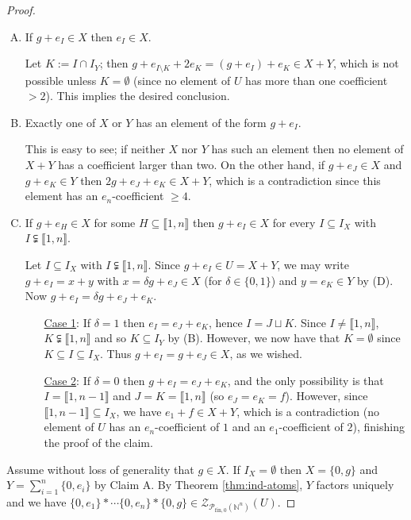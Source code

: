 \documentclass{report}
\newcommand{\NN}{\mathbb{N}}
\renewcommand{\P}{\mathcal{P}}
\newcommand{\Z}{\mathcal{Z}}
\newcommand{\llb}{\llbracket}
\newcommand{\rrb}{\rrbracket}
\newcommand{\fon}{{\textrm{fin}, 0}}
\renewcommand{\:}{\text{:}}
\theoremstyle{definition}
\begin{document}
\begin{proof}
\begin{enumerate}[(A)]
\item If $g + e_I\in X$ then $e_I\in X$. 

Let $K := I\cap I_Y$; then $g + e_{I\setminus K} + 2e_K = (g+e_I) + e_K \in X+Y$, which is not possible unless $K=\emptyset$ (since no element of $U$ has more than one coefficient $>2$).
This implies the desired conclusion.

\item Exactly one of $X$ or $Y$ has an element of the form $g + e_I$. 

This is easy to see; if neither $X$ nor $Y$ has such an element then no element of $X+Y$ has a coefficient larger than two.
On the other hand, if $g+e_J\in X$ and $g+e_K\in Y$ then $2g + e_J + e_K \in X+Y$, which is a contradiction since this element has an $e_n$-coefficient $\ge 4$.

\item If $g+ e_H\in X$ for some $H\subseteq \llb 1,n \rrb$ then $g + e_I \in X$ for every $I\subseteq I_X$ with $I\subsetneqq \llb 1,n\rrb$. 

Let $I \subseteq I_X$ with $I\subsetneqq \llb1,n\rrb$.
Since $g+e_I\in U = X+Y$, we may write $g+e_I = x +y$ with $x = \delta g + e_J\in X$ (for $\delta\in \{0,1\}$) and $y=e_K\in Y$ by (D).
Now $g + e_I = \delta g + e_J + e_K$.
\begin{itemize}
\item[\underline{Case 1}:] If $\delta = 1$ then $e_I = e_J + e_K$, hence $I = J\sqcup K$. 
Since $I\neq \llb1,n\rrb$, $K\subsetneqq \llb 1,n \rrb$ and so $K\subseteq I_Y$ by (B).
However, we now have that $K = \emptyset$ since $K\subseteq I \subseteq I_X$.
Thus $g + e_I = g + e_J \in X$, as we wished.
\item[\underline{Case 2}:] If $\delta = 0$ then $g + e_I = e_J + e_K$, and the only possibility is that $I = \llb 1,n-1\rrb$ and $J = K = \llb 1,n\rrb$ (so $e_J = e_K = f$).
However, since $\llb 1,n-1 \rrb \subseteq I_X$, we have $e_1 + f \in X+Y$, which is a contradiction (no element of $U$ has an $e_n$-coefficient of $1$ and an $e_1$-coefficient of $2$), finishing the proof of the claim.
\end{itemize}
\end{enumerate}

Assume without loss of generality that $g\in X$.
If $I_X = \emptyset$ then $X = \{0,g\}$ and $Y = \sum_{i=1}^n \{0,e_i\}$ by Claim A.
By Theorem \ref{thm:ind-atoms}, $Y$ factors uniquely and we have $\{0,e_1\}*\cdots \{0,e_n\}*\{0,g\}\in \Z_{\P_\fon(\NN^n)}(U)$.


\end{proof}
\end{document}
